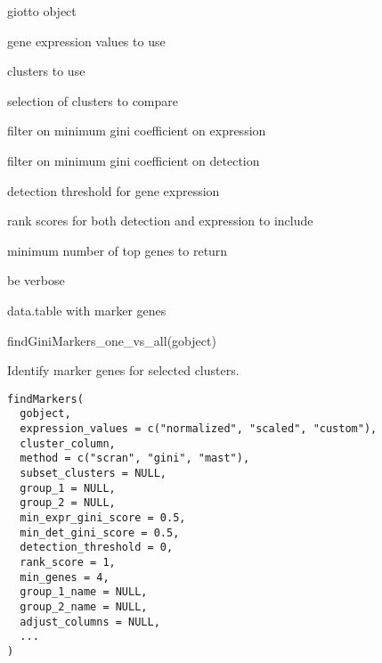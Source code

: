 \documentclass[a4paper]{book}
\begin{document}
%
\begin{Arguments}
\begin{ldescription}
\item[\code{gobject}] giotto object

\item[\code{expression\_values}] gene expression values to use

\item[\code{cluster\_column}] clusters to use

\item[\code{subset\_clusters}] selection of clusters to compare

\item[\code{min\_expr\_gini\_score}] filter on minimum gini coefficient on expression

\item[\code{min\_det\_gini\_score}] filter on minimum gini coefficient on detection

\item[\code{detection\_threshold}] detection threshold for gene expression

\item[\code{rank\_score}] rank scores for both detection and expression to include

\item[\code{min\_genes}] minimum number of top genes to return

\item[\code{verbose}] be verbose
\end{ldescription}
\end{Arguments}
%
\begin{Value}
data.table with marker genes
\end{Value}
%
\begin{SeeAlso}\relax
{}
\end{SeeAlso}
%
\begin{Examples}
\begin{ExampleCode}
    findGiniMarkers_one_vs_all(gobject)
\end{ExampleCode}
\end{Examples}
%
\begin{Description}\relax
Identify marker genes for selected clusters.
\end{Description}
%
\begin{Usage}
\begin{verbatim}
findMarkers(
  gobject,
  expression_values = c("normalized", "scaled", "custom"),
  cluster_column,
  method = c("scran", "gini", "mast"),
  subset_clusters = NULL,
  group_1 = NULL,
  group_2 = NULL,
  min_expr_gini_score = 0.5,
  min_det_gini_score = 0.5,
  detection_threshold = 0,
  rank_score = 1,
  min_genes = 4,
  group_1_name = NULL,
  group_2_name = NULL,
  adjust_columns = NULL,
  ...
)
\end{verbatim}
\end{Usage}
\end{document}

